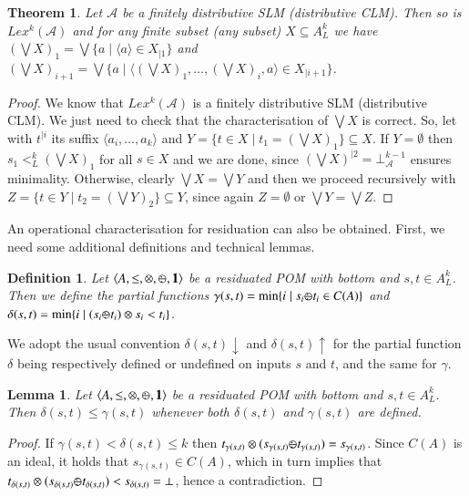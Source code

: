 \documentclass[a4paper]{elsarticle}
\newtheorem{definition}{Definition}
\newtheorem{lemma}{Lemma}
\newtheorem{theorem}{Theorem}
\newcommand{\monop}{\otimes}
\newcommand{\1}{\mathbf{1}}
\def\odiv{{ \ominus\hspace{-8pt}:}\;}
\begin{document}
\begin{theorem}\label{theo:lexiSLM}
	Let $\mathcal{A}$ be a finitely distributive SLM (distributive CLM).
	Then so is $Lex^k(\mathcal{A})$ %
	and for any finite subset (any subset) $X \subseteq A^k_L$ 
         we have $(\bigvee X)_1 = \bigvee \{ a \mid \langle a \rangle \in X_{\mid 1}\}$
         and $(\bigvee X)_{i+1} = \bigvee \{ a \mid \langle (\bigvee X)_1, \ldots, (\bigvee X)_i, a \rangle \in X_{\mid i+1}\}$.
\end{theorem}
\begin{proof}
	We know that $Lex^k(\mathcal{A})$ is a finitely distributive SLM (distributive CLM). We just need to check that
	 the characterisation of $\bigvee X$ is correct. So, let with $t^{\mid i}$ its suffix $\langle a_i, \ldots, a_k \rangle$
	 and $Y = \{ t \in X \mid t_1 = (\bigvee X)_1\} \subseteq X$. 
	If $Y= \emptyset$ then $s_1 <^k_L (\bigvee X)_1$ for all $s \in X$ and we are done,
	since $(\bigvee X)^{\mid 2} = \bot^{k-1}_\mathcal{A}$ ensures minimality.
	Otherwise, clearly $\bigvee X = \bigvee Y$ and then we proceed 
	recursively with  $Z =  \{ t \in Y \mid t_2 = (\bigvee Y)_2\} \subseteq Y$,
	since again $Z = \emptyset$ or $\bigvee Y = \bigvee Z$.
\end{proof}

An operational characterisation for residuation can also be obtained. 
First, we need some additional definitions and technical lemmas.

\begin{definition}
	Let $\langle A, \leq, \monop, \odiv, \1 \rangle$
	be a residuated POM with bottom and $s, t \in A^k_L$. Then 
	we define the partial functions 
	$\gamma(s, t) = \min\{ i \mid s_i \odiv t_i \in C(A)\}$
	and $\delta(s, t) = \min\{ i \mid (s_i \odiv t_i) \otimes s_i < t_i\}$.
\end{definition}

We adopt the usual convention $\delta(s,t)\downarrow$ and $\delta(s,t)\uparrow$ for 
the partial function $\delta$ being respectively defined or undefined on inputs $s$ and $t$,
and the same for $\gamma$.


\begin{lemma}\label{limit}
	Let $\langle A, \leq, \monop, \odiv, \1 \rangle$
	be a residuated POM with bottom and $s, t \in A^k_L$. Then 
	$\delta(s,t) \leq \gamma(s,t)$
	whenever both 	$\delta(s,t)$ and $\gamma(s,t)$
	are defined.
\end{lemma}
\begin{proof}
	If $\gamma(s,t) < \delta(s,t) \leq k$ then 
	$t_{\gamma(s,t)} \otimes (s_{\gamma(s,t)} \odiv t_{\gamma(s,t)})  = s_{\gamma(s,t)}$.
	Since $C(A)$ is an ideal, it holds that $s_{\gamma(s,t)} \in C(A)$, 
	which in turn implies that $t_{\delta(s,t)} \otimes (s_{\delta(s,t)} \odiv t_{\delta(s,t)}) < s_{\delta(s,t)} = \bot$,
	hence a contradiction. 
\end{proof}
\end{document}

